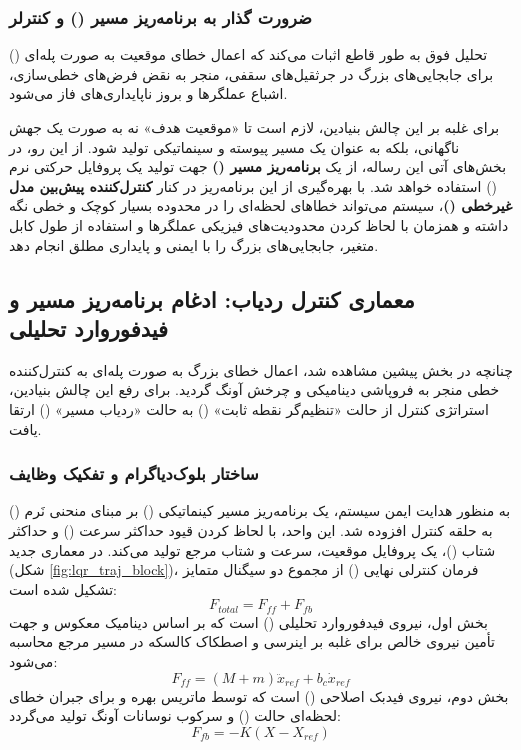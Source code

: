 \subsubsection{ضرورت گذار به برنامه‌ریز مسیر () و کنترلر }
تحلیل فوق به طور قاطع اثبات می‌کند که اعمال خطای موقعیت به صورت پله‌ای () برای جابجایی‌های بزرگ در جرثقیل‌های سقفی، منجر به نقض فرض‌های خطی‌سازی، اشباع عملگرها و بروز ناپایداری‌های فاز می‌شود.

برای غلبه بر این چالش بنیادین، لازم است تا «موقعیت هدف» نه به صورت یک جهش ناگهانی، بلکه به عنوان یک مسیر پیوسته و سینماتیکی تولید شود. از این رو، در بخش‌های آتی این رساله، از یک \textbf{برنامه‌ریز مسیر ()} جهت تولید یک پروفایل حرکتی نرم () استفاده خواهد شد. با بهره‌گیری از این برنامه‌ریز در کنار \textbf{کنترل‌کننده پیش‌بین مدل غیرخطی ()}، سیستم می‌تواند خطاهای لحظه‌ای را در محدوده بسیار کوچک و خطی نگه داشته و همزمان با لحاظ کردن محدودیت‌های فیزیکی عملگرها و استفاده از طول کابل متغیر، جابجایی‌های بزرگ را با ایمنی و پایداری مطلق انجام دهد.

\subsection{معماری کنترل ردیاب: ادغام برنامه‌ریز مسیر و فیدفوروارد تحلیلی}

چنانچه در بخش پیشین مشاهده شد، اعمال خطای بزرگ به صورت پله‌ای به کنترل‌کننده خطی  منجر به فروپاشی دینامیکی و چرخش آونگ گردید. برای رفع این چالش بنیادین، استراتژی کنترل از حالت «تنظیم‌گر نقطه ثابت» () به حالت «ردیاب مسیر» () ارتقا یافت.

\subsubsection{ساختار بلوک‌دیاگرام و تفکیک وظایف}
به منظور هدایت ایمن سیستم، یک برنامه‌ریز مسیر کینماتیکی () بر مبنای منحنی نَرم () به حلقه کنترل افزوده شد. این واحد، با لحاظ کردن قیود حداکثر سرعت () و حداکثر شتاب ()، یک پروفایل موقعیت، سرعت و شتاب مرجع تولید می‌کند.
در معماری جدید (شکل \ref{fig:lqr_traj_block})، فرمان کنترلی نهایی () از مجموع دو سیگنال متمایز تشکیل شده است:
\begin{equation}
    F_{total} = F_{ff} + F_{fb}
\end{equation}
بخش اول، نیروی فیدفوروارد تحلیلی () است که بر اساس دینامیک معکوس و جهت تأمین نیروی خالص برای غلبه بر اینرسی و اصطکاک کالسکه در مسیر مرجع محاسبه می‌شود:
\begin{equation}
    F_{ff} = (M + m)\ddot{x}_{ref} + b_c \dot{x}_{ref}
\end{equation}
بخش دوم، نیروی فیدبک اصلاحی () است که توسط ماتریس بهره  و برای جبران خطای لحظه‌ای حالت () و سرکوب نوسانات آونگ تولید می‌گردد:
\begin{equation}
    F_{fb} = -K(X - X_{ref})
\end{equation}

